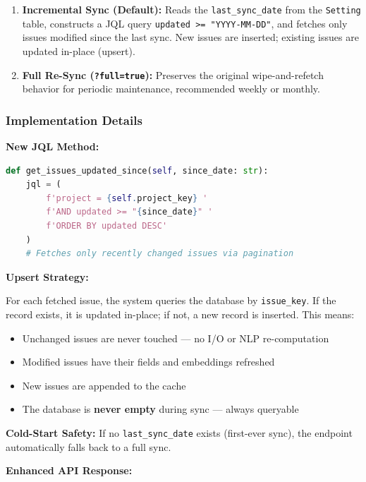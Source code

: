 \documentclass[12pt, a4paper]{article}
\begin{document}
\begin{enumerate}
    \item \textbf{Incremental Sync (Default):} Reads the \texttt{last\_sync\_date} from the \texttt{Setting} table, constructs a JQL query \texttt{updated >= "YYYY-MM-DD"}, and fetches only issues modified since the last sync. New issues are inserted; existing issues are updated in-place (upsert).

    \item \textbf{Full Re-Sync (\texttt{?full=true}):} Preserves the original wipe-and-refetch behavior for periodic maintenance, recommended weekly or monthly.
\end{enumerate}

\subsubsection{Implementation Details}

\textbf{New JQL Method:}

\begin{lstlisting}[language=Python, caption={Incremental JQL Filter — jira\_client.py}]
def get_issues_updated_since(self, since_date: str):
    jql = (
        f'project = {self.project_key} '
        f'AND updated >= "{since_date}" '
        f'ORDER BY updated DESC'
    )
    # Fetches only recently changed issues via pagination
\end{lstlisting}

\textbf{Upsert Strategy:}

For each fetched issue, the system queries the database by \texttt{issue\_key}. If the record exists, it is updated in-place; if not, a new record is inserted. This means:

\begin{itemize}
    \item Unchanged issues are never touched — no I/O or NLP re-computation
    \item Modified issues have their fields and embeddings refreshed
    \item New issues are appended to the cache
    \item The database is \textbf{never empty} during sync — always queryable
\end{itemize}

\textbf{Cold-Start Safety:} If no \texttt{last\_sync\_date} exists (first-ever sync), the endpoint automatically falls back to a full sync.

\textbf{Enhanced API Response:}
\end{document}
